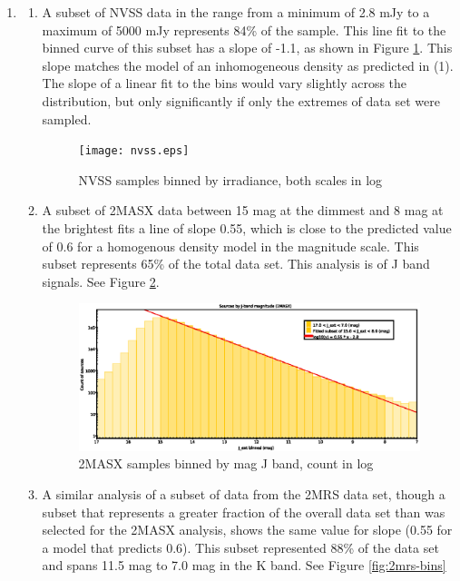\documentclass{paper}
\begin{document}
\begin{enumerate}
  \pagebreak \item
    \begin{enumerate}
      \item
        A subset of NVSS data in the range from a minimum of 2.8 mJy to a
        maximum of 5000 mJy represents 84\% of the sample. This line fit
        to the binned curve of this subset has a slope of -1.1, as shown
        in Figure \ref{fig:nvss-bins}. This slope matches the model of an 
        inhomogeneous density as predicted in (1).  The slope of a linear 
        fit to the bins would vary slightly across the distribution, but only 
        significantly if only the extremes of data set were sampled.

        \begin{figure}
          \texttt{[image: nvss.eps]}
          \caption{NVSS samples binned by irradiance, both scales in log}
          \label{fig:nvss-bins}
        \end{figure}

      \item
        A subset of 2MASX data between 15 mag at the dimmest and 8 mag at the
        brightest fits a line of slope 0.55, which is close to the predicted
        value of 0.6 for a homogenous density model in the magnitude scale.
        This subset represents 65\% of the total data set. This analysis
        is of J band signals. See Figure \ref{fig:2masx-bins}.

        \begin{figure}
          \includegraphics[width=\linewidth]{2masx.eps}
          \caption{2MASX samples binned by mag J band, count in log}
          \label{fig:2masx-bins}
        \end{figure}

      \item
        A similar analysis of a subset of data from the 2MRS data set, 
        though a subset that represents a greater fraction of the overall 
        data set than was selected for the 2MASX analysis, shows the same
        value for slope (0.55 for a model that predicts 0.6). This subset
        represented 88\% of the data set and spans 11.5 mag to 7.0 mag in the
        K band. See Figure \ref{fig:2mrs-bins}


\end{enumerate}
\end{enumerate}
\end{document}
